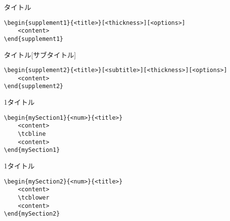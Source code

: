 \documentclass[dvipdfmx,uplatex,b5j,8pt,nomag*]{jsarticle}
\begin{document}
\begin{multicols}{2}
\begin{supplement1}{タイトル}
\end{supplement1}
\columnbreak
\begin{lstlisting}
\begin{supplement1}{<title>}[<thickness>][<options>]
    <content>
\end{supplement1}
\end{lstlisting}
\end{multicols}

\begin{multicols}{2}
    \begin{supplement2}{タイトル}[サブタイトル]
\end{supplement2}
\columnbreak
\begin{lstlisting}
\begin{supplement2}{<title>}[<subtitle>][<thickness>][<options>]
    <content>
\end{supplement2}
\end{lstlisting}
\end{multicols}

\newpage
\begin{multicols}{2}
\begin{mySection1}{1}{タイトル}
    \tcbline
\end{mySection1}
\columnbreak
\begin{lstlisting}
\begin{mySection1}{<num>}{<title>}
    <content>
    \tcbline
    <content>
\end{mySection1}
\end{lstlisting}
\end{multicols}

\begin{multicols}{2}
\begin{mySection2}{1}{タイトル}
    \tcblower
\end{mySection2}
\columnbreak
\begin{lstlisting}
\begin{mySection2}{<num>}{<title>}
    <content>
    \tcblower
    <content>
\end{mySection2}
\end{lstlisting}
\end{multicols}
\end{document}
